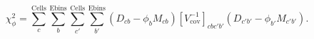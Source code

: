 \begin{equation}
    \chi^2_\phi = \sum_c^\textrm{Cells}\sum_b^\textrm{Ebins}\sum_{c'}^\textrm{Cells}\sum_{b'}^\textrm{Ebins} \left(D_{cb} - \phi_{b}M_{cb}\right) \left[V_\textrm{cov}^{-1}\right]_{cbc'b'} \left(D_{c'b'} - \phi_{b'}M_{c'b'}\right).
\end{equation}

\bigbreak

%
%
%
%
%
%

